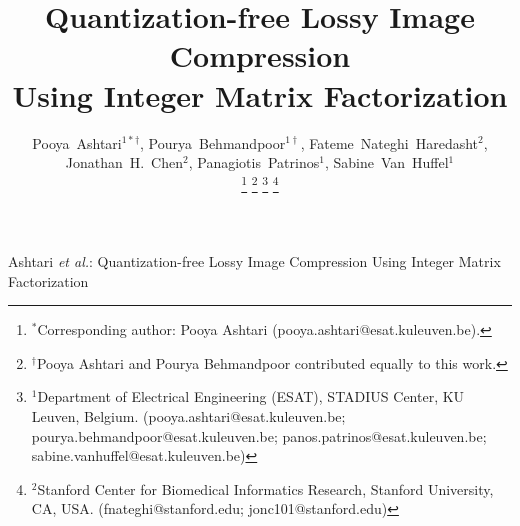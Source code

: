 \documentclass[journal]{IEEEtran}
\begin{document}
\title{Quantization-free Lossy Image Compression\\ Using Integer Matrix Factorization}

\author{
    Pooya~Ashtari$^{1*\dag}$,
    Pourya~Behmandpoor$^{1\dag}$,
    Fateme~Nateghi~Haredasht$^{2}$,
    Jonathan~H.~Chen$^{2}$,
    Panagiotis~Patrinos$^{1}$,
    Sabine~Van~Huffel$^{1}$

    \thanks{$^{*}$Corresponding author: Pooya Ashtari (pooya.ashtari@esat.kuleuven.be).}
    \thanks{$^{\dag}$Pooya Ashtari and Pourya Behmandpoor contributed equally to this work.}
    \thanks{$^{1}$Department of Electrical Engineering (ESAT), STADIUS Center, KU Leuven, Belgium. (pooya.ashtari@esat.kuleuven.be; pourya.behmandpoor@esat.kuleuven.be; panos.patrinos@esat.kuleuven.be; sabine.vanhuffel@esat.kuleuven.be)}
    \thanks{$^{2}$Stanford Center for Biomedical Informatics Research, Stanford University, CA, USA. (fnateghi@stanford.edu; jonc101@stanford.edu)}
}

%
{Ashtari \MakeLowercase{\textit{et al.}}: Quantization-free Lossy Image Compression Using Integer Matrix Factorization}

\maketitle












\appendices


\printbibliography



\end{document}
